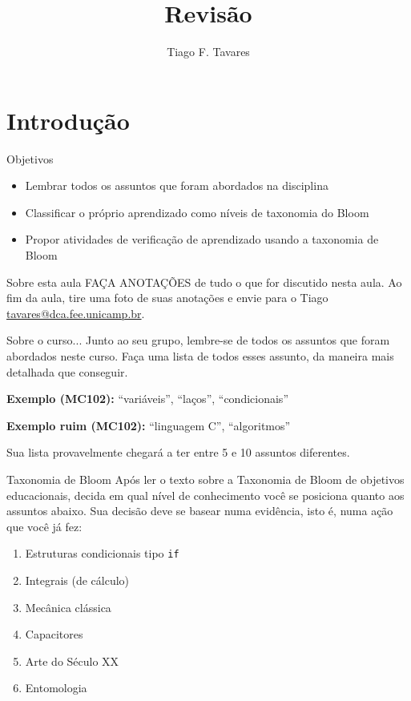 \documentclass{beamer}
\title[Revisao]{Revisão}
\author{Tiago F. Tavares}
\institute{FEEC -- UNICAMP}
\date{}
\begin{document}
\begin{frame}
  \titlepage
\end{frame}


\section{Introdução}

\begin{frame}{Objetivos}
  \Large
  \begin{itemize}
    \item Lembrar todos os assuntos que foram abordados na disciplina
    \item Classificar o próprio aprendizado como níveis de taxonomia do Bloom
    \item Propor atividades de verificação de aprendizado usando a taxonomia de
      Bloom
  \end{itemize}
\end{frame}

\begin{frame}[fragile]{Sobre esta aula}
\LARGE
  FAÇA ANOTAÇÕES de tudo o que for discutido nesta aula. Ao fim da aula, tire
  uma foto de suas anotações e envie para o Tiago
  \url{tavares@dca.fee.unicamp.br}.
\end{frame}

\begin{frame}[fragile]{Sobre o curso...}
  \Large
  Junto ao seu grupo, lembre-se de todos os assuntos que foram abordados neste
  curso. Faça uma lista de todos esses assunto, da maneira mais detalhada que
  conseguir.

  \textbf{Exemplo (MC102):} ``variáveis'', ``laços'', ``condicionais''

  \textbf{Exemplo ruim (MC102):} ``linguagem C'', ``algoritmos''

  \vspace{1cm}

  Sua lista provavelmente chegará a ter entre 5 e 10 assuntos diferentes.
\end{frame}

\begin{frame}[fragile]{Taxonomia de Bloom}
  \large
  Após ler o texto sobre a Taxonomia de Bloom de objetivos educacionais, decida
  em qual nível de conhecimento você se posiciona quanto aos assuntos abaixo.
  Sua decisão deve se basear numa evidência, isto é, numa ação que você já fez:
  \begin{enumerate}
    \item Estruturas condicionais tipo \texttt{if}
    \item Integrais (de cálculo)
    \item Mecânica clássica
    \item Capacitores
    \item Arte do Século XX
    \item Entomologia
  \end{enumerate}
\end{frame}
\end{document}
